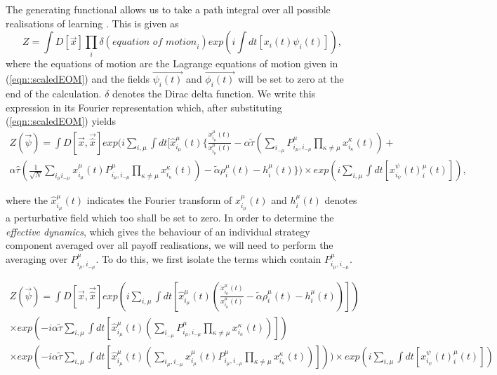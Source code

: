 \documentclass{article}
\newcommand{\xmu}[2]{x_{#1_#2}^{#2}(t)}
\newcommand{\payoff}[2]{P^{#2}_{#1_#2, #1_{-#2}}}
\newcommand{\dxmu}[1]{\dot{x}_{#1_\mu}^{\mu} (t)}
\newcommand{\hxmu}[1]{\hat{x}_{#1_\mu}^{\mu} (t)}
\newcommand{\talpha}{\tilde{\alpha}}
\newcommand{\ttau}{\tilde{\tau}}
\newcommand{\htau}{\hat{\tau}}
\newcommand{\eom}{\frac{\dxmu{i}}{\xmu{i}{\mu}} - \alpha \ttau \left ( \sum_{i_{-\mu}} \payoff{i}{\mu} \prod_{\kappa \neq \mu} \xmu{i}{\kappa} \right ) + \\ \alpha \htau \left ( \frac{1}{\sqrt{N}} \sum_{i_\mu i_{-\mu}} \xmu{i}{\mu} \payoff{i}{\mu} \prod_{\kappa \neq \mu} \xmu{i}{\kappa} \right ) - \talpha \rho^{\mu}_{i}(t)}
\begin{document}
The generating functional allows us to take a path integral over all possible realisations of
learning \cite{Mezard1986}. This is given as
%
\begin{equation}
	Z = \int D[\Vec{x}] \prod_i \delta(\textit{equation of motion}_i) exp(i
	\int dt[x_i(t) \psi_i(t)]), 
\end{equation}
%
where the equations of motion are the Lagrange equations of motion given in (\ref{eqn::scaledEOM}) and
the fields $\Vec{\psi_i(t)}$ and $\Vec{\phi_i(t)}$ will be set to zero at the end of the
calculation. $\delta$ denotes the Dirac delta function. We write this expression in its Fourier
representation which, after substituting (\ref{eqn::scaledEOM}) yields	
\begin{equation}
	\begin{split}
\label{eqn::generatingfunctional}
	Z(\Vec{\psi}) = \int D[\Vec{x}, \Vec{\hat{x}}] exp(i \sum_{i, \mu} \int dt[\hxmu{i}  \{  \eom  -h_i^\mu (t) \} ) 
	\times exp(i \sum_{i, \mu}
	\int dt[\xmu{i} \psi^\mu_i(t)]),
\end{split}
\end{equation}
	
where the $\hxmu{i}$ indicates the Fourier transform of $\xmu{i}{\mu}$ and $h_i^\mu (t)$ denotes a perturbative field which too shall be set to zero. In order to determine the \textit{effective dynamics}, which gives the behaviour of an individual strategy component averaged over all payoff realisations, we will need to perform the averaging over $\payoff{i}{\mu}$. To do this, we first isolate the terms which contain $\payoff{i}{\mu}$.
	
\begin{equation}
	\begin{split}
	Z(\Vec{\psi}) = \int D[\Vec{x}, \Vec{\hat{x}}] exp \left( i \sum_{i, \mu} \int dt \left[ \hxmu{i} (\frac{\dxmu{i}}{\xmu{i}{\mu}} - \talpha \rho_i^\mu (t) - h_i^\mu (t)) \right] \right) \\
	\times exp \left(-i \alpha \ttau \sum_{i, \mu} \int dt \left [\hxmu{i} \left ( \sum_{i_{-\mu}} \payoff{i}{\mu} \prod_{\kappa \neq \mu} \xmu{i}{\kappa} \right ) \right] \right) \\
    \times exp(-i \alpha \ttau \sum_{i, \mu} \int dt [\hxmu{i} \left ( \sum_{i_\mu, i_{-\mu}} \xmu{i}{\mu} \payoff{i}{\mu} \prod_{\kappa \neq \mu} \xmu{i}{\kappa} \right )])) 
	\times exp(i \sum_{i, \mu}
	\int dt[\xmu{i} \psi^\mu_i(t)])
\end{split}
\end{equation}
\end{document}
